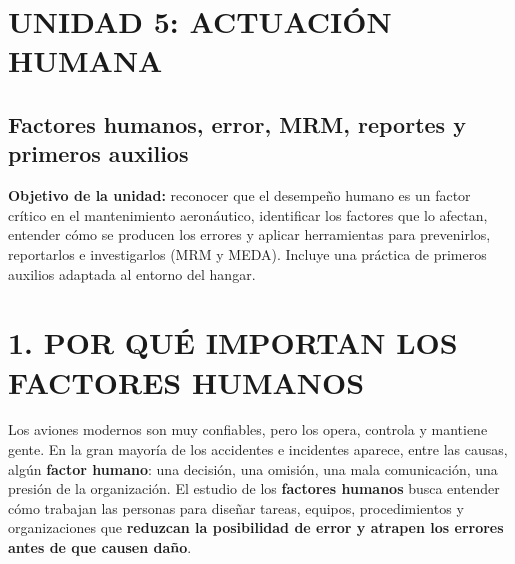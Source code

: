 \clearpage
\section*{UNIDAD 5: ACTUACIÓN HUMANA}
\subsection*{Factores humanos, error, MRM, reportes y primeros auxilios}

\begin{recuadro}
\textbf{Objetivo de la unidad:} reconocer que el desempeño humano es un factor crítico en el
mantenimiento aeronáutico, identificar los factores que lo afectan, entender cómo se producen los
errores y aplicar herramientas para prevenirlos, reportarlos e investigarlos (MRM y MEDA).
Incluye una práctica de primeros auxilios adaptada al entorno del hangar.
\end{recuadro}

\section*{1. POR QUÉ IMPORTAN LOS FACTORES HUMANOS}

Los aviones modernos son muy confiables, pero los opera, controla y mantiene gente. En la gran
mayoría de los accidentes e incidentes aparece, entre las causas, algún \textbf{factor humano}:
una decisión, una omisión, una mala comunicación, una presión de la organización. El estudio de
los \textbf{factores humanos} busca entender cómo trabajan las personas para diseñar tareas,
equipos, procedimientos y organizaciones que \textbf{reduzcan la posibilidad de error y atrapen
los errores antes de que causen daño}.

